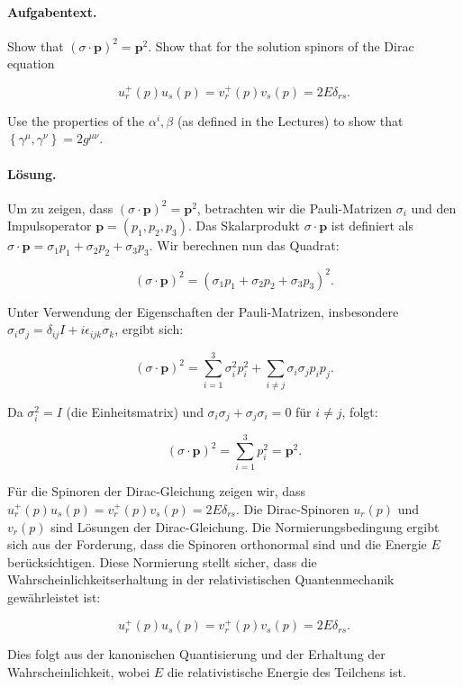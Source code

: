 \documentclass[11pt,a4paper]{article}
\begin{document}
\paragraph{Aufgabentext.}
Show that $(\sigma \cdot \mathbf{p})^2=\mathbf{p}^2$. Show that for the solution spinors of the Dirac equation

$$
u_r^{+}(p) u_s(p)=v_r^{+}(p) v_s(p)=2 E \delta_{r s} .
$$


Use the properties of the $\alpha^i, \beta$ (as defined in the Lectures) to show that $\left\{\gamma^\mu, \gamma^\nu\right\}=2 g^{\mu \nu}$.

\paragraph{Lösung.}
Um zu zeigen, dass $(\sigma \cdot \mathbf{p})^2 = \mathbf{p}^2$, betrachten wir die Pauli-Matrizen $\sigma_i$ und den Impulsoperator $\mathbf{p} = (p_1, p_2, p_3)$. Das Skalarprodukt $\sigma \cdot \mathbf{p}$ ist definiert als $\sigma \cdot \mathbf{p} = \sigma_1 p_1 + \sigma_2 p_2 + \sigma_3 p_3$. Wir berechnen nun das Quadrat:

\[
(\sigma \cdot \mathbf{p})^2 = (\sigma_1 p_1 + \sigma_2 p_2 + \sigma_3 p_3)^2.
\]

Unter Verwendung der Eigenschaften der Pauli-Matrizen, insbesondere $\sigma_i \sigma_j = \delta_{ij} I + i \epsilon_{ijk} \sigma_k$, ergibt sich:

\[
(\sigma \cdot \mathbf{p})^2 = \sum_{i=1}^{3} \sigma_i^2 p_i^2 + \sum_{i \neq j} \sigma_i \sigma_j p_i p_j.
\]

Da $\sigma_i^2 = I$ (die Einheitsmatrix) und $\sigma_i \sigma_j + \sigma_j \sigma_i = 0$ für $i \neq j$, folgt:

\[
(\sigma \cdot \mathbf{p})^2 = \sum_{i=1}^{3} p_i^2 = \mathbf{p}^2.
\]

Für die Spinoren der Dirac-Gleichung zeigen wir, dass $u_r^{+}(p) u_s(p) = v_r^{+}(p) v_s(p) = 2 E \delta_{rs}$. Die Dirac-Spinoren $u_r(p)$ und $v_r(p)$ sind Lösungen der Dirac-Gleichung. Die Normierungsbedingung ergibt sich aus der Forderung, dass die Spinoren orthonormal sind und die Energie $E$ berücksichtigen. Diese Normierung stellt sicher, dass die Wahrscheinlichkeitserhaltung in der relativistischen Quantenmechanik gewährleistet ist:

\[
u_r^{+}(p) u_s(p) = v_r^{+}(p) v_s(p) = 2 E \delta_{rs}.
\]

Dies folgt aus der kanonischen Quantisierung und der Erhaltung der Wahrscheinlichkeit, wobei $E$ die relativistische Energie des Teilchens ist.
\end{document}

